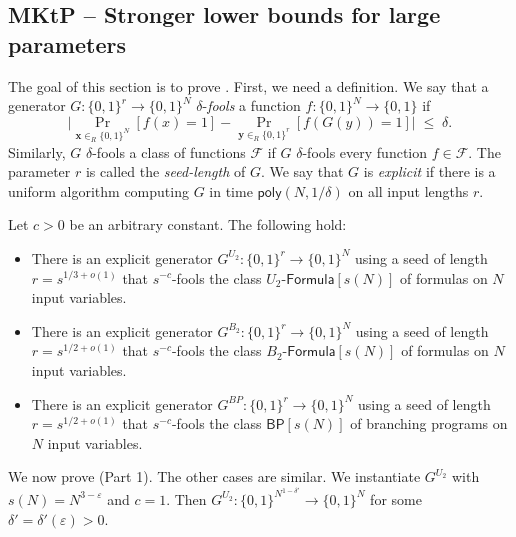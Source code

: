 \documentclass{toc}
\begin{document}
\subsection{MKtP -- Stronger lower bounds for large parameters}\label{ss:stronger}

The goal of this section is to prove . First, we need a definition. We say that a generator $G \colon \{0,1\}^r \to \{0,1\}^N$ $\delta$-\emph{fools} a function $f \colon \{0,1\}^N \to \{0,1\}$ if
$$
\Big |  \Pr_{\bm{x} \in_R \{0,1\}^N}[f(x) = 1] - \Pr_{\bm{y} \in_R \{0,1\}^r}[f(G(y)) = 1]  \Big | \;\leq\; \delta.
$$
Similarly, $G$ $\delta$-fools a class of functions $\mathcal{F}$ if $G$ $\delta$-fools every function $f \in \mathcal{F}$. The parameter $r$ is called the \emph{seed-length} of $G$. We say that $G$ is \emph{explicit} if there is a uniform algorithm computing $G$ in time $\mathsf{poly}(N,1/\delta)$ on all input lengths $r$.

\begin{theorem}\label{thm:PRG}
Let $c > 0$ be an arbitrary constant. The following hold:
\vspace{0.2cm}
\begin{itemize}
\item[\emph{1.}] There is an explicit generator $G^{U_2} \colon \{0,1\}^r \to \{0,1\}^N$ using a seed of length $r = s^{1/3 + o(1)}$ that $s^{-c}$-fools the class $U_2$-$\mathsf{Formula}[s(N)]$ of formulas on $N$ input variables.
\item[\emph{2.}] There is an explicit generator $G^{B_2}\colon \{0,1\}^r \to \{0,1\}^N$ using a seed of length $r = s^{1/2 + o(1)}$ that $s^{-c}$-fools the class $B_2$-$\mathsf{Formula}[s(N)]$ of formulas on $N$ input variables.
\item[\emph{2.}] There is an explicit generator $G^{BP}\colon \{0,1\}^r \to \{0,1\}^N$ using a seed of length $r = s^{1/2 + o(1)}$ that $s^{-c}$-fools the class $\mathsf{BP}[s(N)]$ of branching programs on $N$ input variables.

\end{itemize}
\end{theorem}

\vspace{0.2cm}

We now prove  (Part 1). The other cases are similar. We instantiate $G^{U_2}$ with $s(N) = N^{3 - \varepsilon}$ and $c = 1$. Then $G^{U_2} \colon \{0,1\}^{N^{1 - \delta'}} \to \{0,1\}^{N}$ for some $\delta' = \delta'(\varepsilon) > 0$. 
\end{document}
